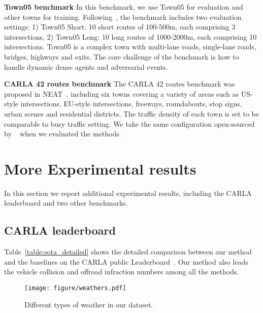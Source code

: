 \documentclass[10pt,twocolumn,letterpaper]{article}
\begin{document}
\noindent\textbf{Town05 benchmark} In this benchmark, we use Town05 for evaluation and other towns for training. Following~\cite{prakash2021multi}, the benchmark includes two evaluation settings: 1) Town05 Short: 10 short routes of 100-500m, each comprising 3 intersections, 2) Town05 Long: 10 long routes of 1000-2000m, each comprising 10 intersections. Town05 is a complex town with multi-lane roads, single-lane roads, bridges, highways and exits. The core challenge of the benchmark is how to handle dynamic dense agents and adversarial events.

\noindent\textbf{CARLA 42 routes benchmark} The CARLA 42 routes benchmark was proposed in NEAT~\cite{chitta2021neat}, including six towns covering a variety of areas such as US-style intersections, EU-style intersections, freeways, roundabouts, stop signs, urban scenes and residential districts. The traffic density of each town is set to be comparable to busy traffic setting. We take the same configuration open-sourced by ~\cite{prakash2021multi} when we evaluated the methods.

\section{More Experimental results}
In this section we report additional experimental results, including the CARLA leaderboard and two other benchmarks.


\subsection{CARLA leaderboard}
Table~\ref{table:sota_detailed} shows the detailed comparison between our method and the baselines on the CARLA public Leaderboard~\cite{leaderboard}.
Our method also leads the vehicle collision and offroad infraction numbers among all the methods.

\begin{figure}[t]
    \centering
    \texttt{[image: figure/weathers.pdf]}
    \caption{Different types of weather in our dataset.}
    \label{fig:weathers}
\end{figure}
\end{document}
